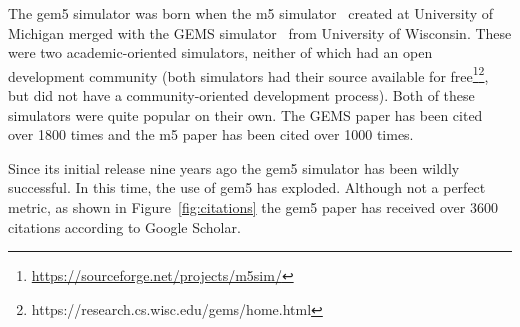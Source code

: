 The gem5 simulator was born when the m5 simulator~\cite{BinkertDHLSR06} created at University of Michigan merged with the GEMS simulator~\cite{MartinSBMXAMHW05} from University of Wisconsin.
These were two academic-oriented simulators, neither of which had an open development community (both simulators had their source available for free\footnote{\url{https://sourceforge.net/projects/m5sim/}}\footnote{https://research.cs.wisc.edu/gems/home.html}, but did not have a community-oriented development process).
Both of these simulators were quite popular on their own.
The GEMS paper has been cited over 1800 times and the m5 paper has been cited over 1000 times.

Since its initial release nine years ago the gem5 simulator has been wildly successful.
In this time, the use of gem5 has exploded.
Although not a perfect metric, as shown in Figure~\ref{fig:citations} the gem5 paper has received over 3600 citations according to Google Scholar.

